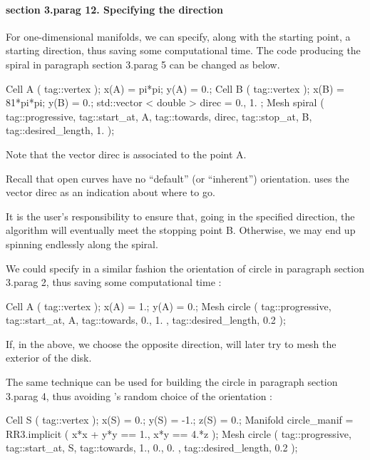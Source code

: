 \paragraph{\numb section 3.\numb parag 12. Specifying the direction}

For one-dimensional manifolds, we can specify, along with the starting point,
a starting direction, thus saving some computational time.
The code producing the spiral in paragraph \numb section 3.\numb parag 5 can be changed
as below.

\verbatim
   Cell A ( tag::vertex );  x(A) =    pi*pi;   y(A) =  0.;
   Cell B ( tag::vertex );  x(B) = 81*pi*pi;   y(B) =  0.;
   std::vector < double > direc = { 0., 1. };
   Mesh spiral ( tag::progressive, tag::start_at, A, tag::towards, direc,
                 tag::stop_at, B, tag::desired_length, 1.                 );
\endverbatim

Note that the vector {\codett direc} is associated to the point {\codett A}.

Recall that open curves have no ``default'' (or ``inherent'') orientation.
{\ManiFEM} uses the vector {\codett direc} as an indication about where to go.

It is the user's responsibility to ensure that, going in the specified direction,
the algorithm will eventually meet the stopping point {\codett B}.
Otherwise, we may end up spinning endlessly along the spiral.

We could specify in a similar fashion the orientation of {\codett circle} in paragraph
\numb section 3.\numb parag 2, thus saving some computational time :

\verbatim
   Cell A ( tag::vertex );  x(A) = 1.;  y(A) = 0.;
   Mesh circle ( tag::progressive, tag::start_at, A,
                 tag::towards, { 0., 1. }, tag::desired_length, 0.2 );
\endverbatim

If, in the above, we choose the opposite {\codett direc}tion,
{\maniFEM} will later try to mesh the exterior of the disk.

The same technique can be used for building the {\codett circle} in paragraph
\numb section 3.\numb parag 4, thus avoiding \maniFEM's random choice of the orientation :

\verbatim
   Cell S ( tag::vertex );  x(S) =  0.;   y(S) = -1.;  z(S) = 0.;
   Manifold circle_manif = RR3.implicit ( x*x + y*y == 1., x*y == 4.*z );
   Mesh circle ( tag::progressive, tag::start_at, S,
                 tag::towards, { 1., 0., 0. }, tag::desired_length, 0.2 );
\endverbatim

